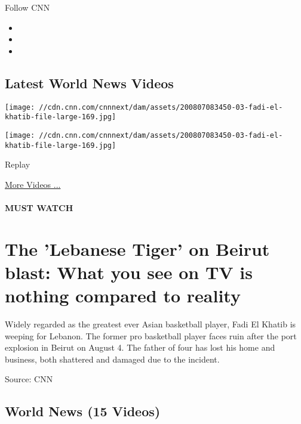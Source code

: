 Follow CNN

\begin{itemize}
\item
\item
\item
\end{itemize}

\hypertarget{latest-world-news-videos}{%
\subsection{Latest World News Videos}\label{latest-world-news-videos}}

\texttt{[image: //cdn.cnn.com/cnnnext/dam/assets/200807083450-03-fadi-el-khatib-file-large-169.jpg]}

\texttt{[image: //cdn.cnn.com/cnnnext/dam/assets/200807083450-03-fadi-el-khatib-file-large-169.jpg]}\href{javascript:void(0);}{}

Replay

\href{/videos}{More Videos ...}

\hypertarget{must-watch}{%
\paragraph{MUST WATCH}\label{must-watch}}

\hypertarget{the-lebanese-tiger-on-beirut-blast-what-you-see-on-tv-is-nothing-compared-to-reality}{%
\section{The 'Lebanese Tiger' on Beirut blast: What you see on TV is
nothing compared to
reality}\label{the-lebanese-tiger-on-beirut-blast-what-you-see-on-tv-is-nothing-compared-to-reality}}

Widely regarded as the greatest ever Asian basketball player, Fadi El
Khatib is weeping for Lebanon. The former pro basketball player faces
ruin after the port explosion in Beirut on August 4. The father of four
has lost his home and business, both shattered and damaged due to the
incident.

Source: CNN

\hypertarget{world-news-15-videos}{%
\subsection{World News (15 Videos)}\label{world-news-15-videos}}

\href{/videos/sports/2020/08/07/fadi-el-khatib-basketball-hero-lebanon-beirut-explosion-charity-spt-intl-lon-orig.cnn/video/playlists/around-the-world/}{}

